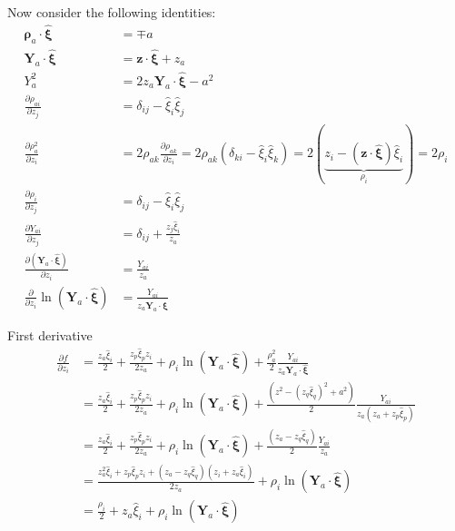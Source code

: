 \documentclass[10pt]{report}
\begin{document}
{Now consider the following identities:
\begin{align}
\bm\rho_a\cdot\hat{\bm\xi}&=\mp a\\
\bm Y_a\cdot\hat{\bm \xi}&=\bm z\cdot\hat{\bm\xi}+z_a\\
Y^2_a&=2z_a\bm Y_a\cdot\hat{\bm \xi}-a^2\\
\frac{\partial \rho_{ai}}{\partial z_j}&=\delta_{ij}-\hat{\xi}_i\hat{\xi}_j\\
\frac{\partial \rho^2_a}{\partial z_i}&=2\rho_{ak} \frac{\partial  \rho_{ak}}{\partial z_i}=2\rho_{ak}\left(\delta_{ki}-\hat{\xi}_i\hat{\xi}_k\right)
=2(\underbrace{z_i-(\bm z\cdot\hat{\bm \xi})\hat{ \xi}_i}_{\rho_i})=2\rho_{i}\\
\frac{\partial \rho_{i}}{\partial z_j}&=\delta_{ij}-\hat{\xi}_i\hat{\xi}_j\\
\frac{\partial Y_{ai}}{\partial z_j}&=\delta_{ij}+\frac{z_j\hat{\xi}_i}{z_a}\\
\frac{\partial (\bm Y_a \cdot \hat{\bm \xi})}{\partial z_i}&=\frac{ Y_{ai}}{z_a}\\
\frac{\partial }{\partial z_i}\ln (\bm Y_a \cdot \hat{\bm \xi})&=\frac{ Y_{ai}}{z_a \bm Y_a \cdot \hat{\bm \xi}}
\end{align}

First derivative
\begin{align}
\frac{\partial f}{\partial  z_i}
&=\frac{z_a\hat{\xi}_i}{2}+\frac{z_p\hat{\xi}_p z_i}{2z_a}+\rho_i\ln(\bm Y_a \cdot \hat{\bm \xi})+\frac{\rho^2_a}{2}\frac{ Y_{ai}}{z_a \bm Y_a \cdot \hat{\bm \xi}}\nonumber\\
&=\frac{z_a\hat{\xi}_i}{2}+\frac{z_p\hat{\xi}_p z_i}{2z_a}+\rho_i\ln(\bm Y_a \cdot \hat{\bm \xi})+\frac{(z^2-(z_q\hat{\xi}_q)^2+a^2)}{2}\frac{ Y_{ai}}{z_a (z_a+z_p\hat{\xi}_p)}\nonumber\\
&=\frac{z_a\hat{\xi}_i}{2}+\frac{z_p\hat{\xi}_p z_i}{2z_a}+\rho_i\ln(\bm Y_a \cdot \hat{\bm \xi})+\frac{(z_a-z_q\hat{\xi}_q)}{2}\frac{ Y_{ai}}{z_a }\nonumber\\
&=\frac{z_a^2\hat{\xi}_i+z_p\hat{\xi}_p z_i+(z_a-z_q\hat{\xi}_q)(z_i+z_a\hat{\xi}_i)}{2z_a}+\rho_i\ln(\bm Y_a \cdot \hat{\bm \xi})\nonumber\\
&=\frac{\rho_i}{2}+z_a\hat{\xi}_i+\rho_i\ln(\bm Y_a \cdot \hat{\bm \xi})
\end{align}


}
\end{document}
